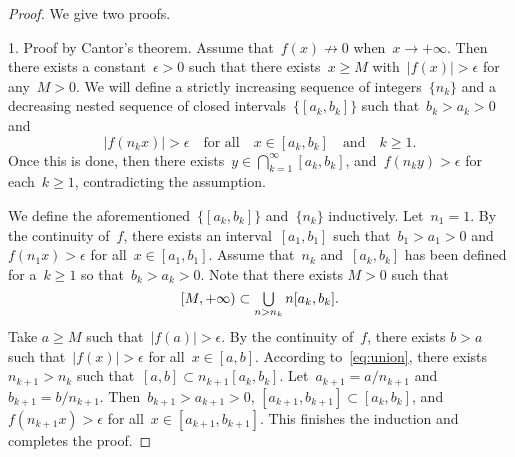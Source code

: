 \documentclass[11pt,a4paper]{article}
\theoremstyle{definition}
\DeclareMathOperator*{\mcup}{\mathsmaller{\bigcup}}
\numberwithin{equation}{section}
\begin{document}
\begin{proof} We give two proofs. 

  1. Proof by Cantor's theorem. Assume that~$f(x)\nrightarrow 0$ when~$x\to +\infty$. Then there
     exists a constant~$\epsilon > 0$ such that there exists~$x \ge M$ with~$|f(x)|>\epsilon$
     for any~$M > 0$. 
     We will define 
     a strictly increasing sequence of integers~$\{n_k\}$ and
     a decreasing nested sequence of closed intervals~$\{[a_k, b_k]\}$
     such that~$b_k>a_k > 0$ and 
     \begin{equation}
       |f(n_kx)| > \epsilon \quad \text{for all}\quad x \in [a_k, b_k] \quad \text{and}\quad   k\ge 1.
     \end{equation}
     Once this is done, then there exists~$y\in\bigcap_{k=1}^\infty [a_k, b_k]$, and~$f(n_ky)> \epsilon$ for each~$k\ge 1$, contradicting the assumption. 

     We define the aforementioned~$\{[a_k,b_k]\}$ and~$\{n_k\}$ inductively.
     Let~$n_1=1$. By the continuity of~$f$, there exists an interval~$[a_1, b_1]$ such
     that~$b_1>a_1>0$ and~$f(n_1x)> \epsilon$ for all~$x\in [a_1, b_1]$. Assume that~$n_k$
     and~$[a_k, b_k]$ has been defined for a~$k\ge 1$ so that~$b_k>a_k >0$. Note that there exists
     $M>0$ such that
     \begin{equation}
       \label{eq:union}
       [M, +\infty) \subset \mcup_{n> n_k} n[a_k, b_k].
     \end{equation}
     Take $a \ge  M$ such that~$|f(a)|> \epsilon$. By the continuity of~$f$, there exists
     $b>a$ such that~$|f(x)|>\epsilon$ for all~$x\in[a, b]$. According to~\eqref{eq:union},
     there exists $n_{k+1} > n_k$ such that~$[a, b] \subset n_{k+1}[a_k, b_k]$.
     Let~$a_{k+1} = a/n_{k+1}$ and~$b_{k+1} = b/n_{k+1}$. Then~$b_{k+1}>a_{k+1}>0$, $[a_{k+1},
     b_{k+1}]\subset[a_k, b_k]$, and~$f(n_{k+1}x) > \epsilon$ for all~$x\in [a_{k+1}, b_{k+1}]$.
     This finishes the induction and completes the proof.   


\end{proof}
\end{document}
